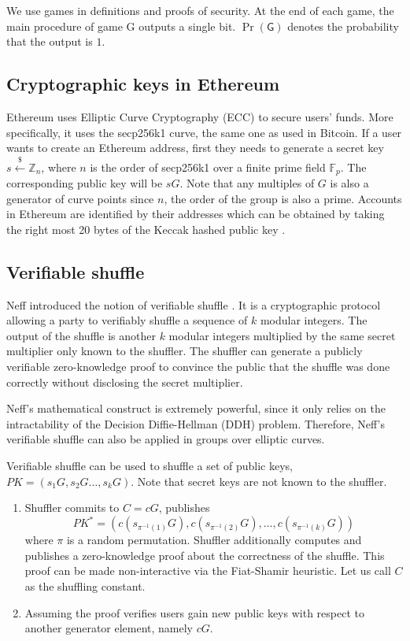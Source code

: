 \documentclass[a4paper,UKenglish,cleveref, autoref]{oasics-v2019}
\begin{document}
We use games in definitions and proofs of security. At the end of each game, the main procedure of game \textsf{G} outputs a single bit. $\Pr(\textsf{G})$ denotes the probability that the output is $1$.
\subsection{Cryptographic keys in Ethereum}
Ethereum uses Elliptic Curve Cryptography (ECC) to secure users' funds. More specifically, it uses the secp256k1 curve, the same one as used in Bitcoin. If a user wants to create an Ethereum address, first they needs to generate a secret key  $s\stackrel{\$}{\leftarrow}\mathbb{Z}_n$, where $n$ is the order of secp256k1 over a finite prime field $\mathbb{F}_{p}$. The corresponding public key will be $sG$. Note that any multiples of $G$ is also a generator of curve points since $n$, the order of the group is also a prime. Accounts in Ethereum are identified by their addresses which can be obtained by taking the right most 20 bytes of the Keccak hashed public key \cite{wood2014ethereum}. 

\subsection{Verifiable shuffle}

Neff introduced the notion of verifiable shuffle \cite{neff2001verifiable}. It is a cryptographic protocol allowing a party to verifiably shuffle a sequence of $k$ modular integers. The output of the shuffle is another $k$ modular integers multiplied by the same secret multiplier only known to the shuffler. The shuffler can generate a publicly verifiable zero-knowledge proof to convince the public that the shuffle was done correctly without disclosing the secret multiplier. 

Neff's mathematical construct is extremely powerful, since it only relies on the intractability of the Decision Diffie-Hellman (DDH) problem. Therefore, Neff's verifiable shuffle can also be applied in groups over elliptic curves.

Verifiable shuffle can be used to shuffle a set of public keys, $PK=(s_{1}G,s_{2}G\dots,s_{k}G)$. Note that secret keys are not known to the shuffler.

\begin{enumerate}
	\item Shuffler commits to $C=cG$, publishes $$PK^*=(c(s_{\pi^{-1}(1)}G),c(s_{\pi^{-1}(2)}G),\dots,c({s_{\pi^{-1}(k)}}G))$$ where $\pi$ is a random permutation. Shuffler additionally computes and publishes a zero-knowledge proof about the correctness of the shuffle. This proof can be made non-interactive via the Fiat-Shamir heuristic. Let us call $C$ as the shuffling constant.
	\item Assuming the proof verifies users gain new public keys with respect to another generator element, namely $cG$.
\end{enumerate}
\end{document}
